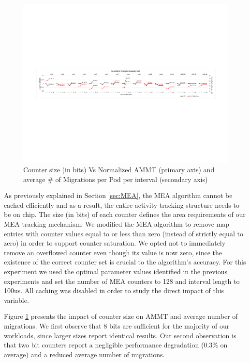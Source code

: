 \begin{figure}[t]
  \includegraphics[width=\textwidth]{figures/counter_size_normalized.pdf}
  \caption{Counter size (in bits) Vs Normalized AMMT (primary axis) and average \# of Migrations per Pod per interval (secondary axis)}
  \label{fig:counter_size}
\end{figure}

As previously explained in Section \ref{sec:MEA}, the MEA algorithm cannot be cached efficiently and as a result, the entire activity tracking structure needs to be on chip. The size (in bits) of each counter defines the area requirements of our MEA tracking mechanism. We modified the MEA algorithm to remove map entries with counter values equal to or less than zero (instead of strictly equal to zero) in order to support counter saturation. We opted not to immediately remove an overflowed counter even though its value is now zero, since the existence of the correct counter set is crucial to the algorithm's accuracy. For this experiment we used the optimal parameter values identified in the previous experiments and set the number of MEA counters to 128 and interval length to 100us. All caching was disabled in order to study the direct impact of this variable.

Figure \ref{fig:counter_size} presents the impact of counter size on AMMT and average number of migrations. We first observe that 8 bits are sufficient for the majority of our workloads, since larger sizes report identical results. Our second observation is that two bit counters report a negligible performance degradation (0.3\% on average) and a reduced average number of migrations.

